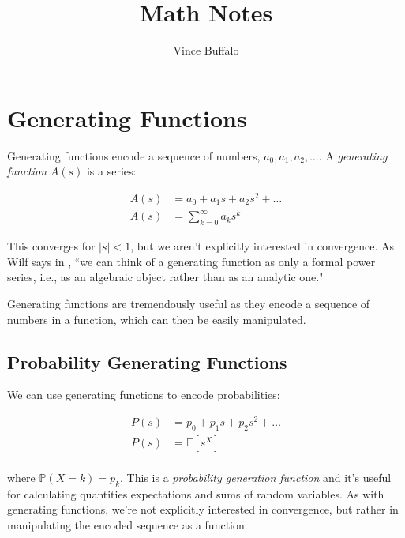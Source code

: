 \documentclass[11pt]{article}
\title{Math Notes}
\author{Vince Buffalo}
\renewcommand{\P}{\mathbb{P}}
\newcommand{\E}{\mathbb{E}}
\begin{document}
\maketitle


% 

\section{Generating Functions}

Generating functions encode a sequence of numbers, $a_0, a_1, a_2, \ldots$. A
\emph{generating function} $A(s)$ is a series:

\begin{align*}
  A(s) &= a_0 + a_1 s + a_2 s^2 + \ldots\\
  A(s) &= \sum_{k=0}^\infty a_k s^k
\end{align*}

This converges for $|s| < 1$, but we aren't explicitly interested in
convergence. As Wilf says in \citep{wilf2013generatingfunctionology}, ``we can
think of a generating function as only a formal power series, i.e., as an
algebraic object rather than as an analytic one."

Generating functions are tremendously useful as they encode a sequence of
numbers in a function, which can then be easily manipulated. 

\subsection{Probability Generating Functions}

We can use generating functions to encode probabilities:

\begin{align*}
  P(s) &= p_0 + p_1 s + p_2 s^2 + \ldots\\
  P(s) &= \E[s^X]\\
\end{align*}

where $\P(X = k) = p_k$. This is a \emph{probability generation function} and
it's useful for calculating quantities expectations and sums of random
variables. As with generating functions, we're not explicitly interested in
convergence, but rather in manipulating the encoded sequence as a function.
\end{document}
